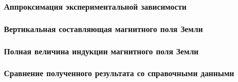 \documentclass[a4paper, 12pt]{article}
\begin{document}
            \subsubsection{Аппроксимация экспериментальной зависимости}

            \subsubsection{Вертикальная составляющая магнитного поля Земли}

            \subsubsection{Полная величина индукции магнитного поля Земли}

            \subsubsection{Сравнение полученного результата со справочными данными}
\end{document}
